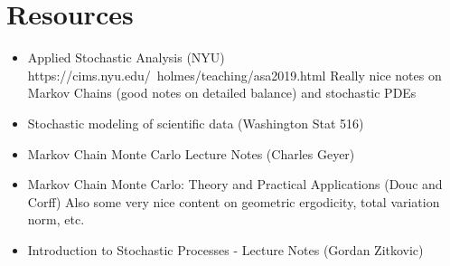 \documentclass[12pt]{article}
\begin{document}
\section{Resources}
\begin{itemize}
\item Applied Stochastic Analysis (NYU)
https://cims.nyu.edu/~holmes/teaching/asa2019.html
Really nice notes on Markov Chains (good notes on detailed balance) and stochastic PDEs
\item Stochastic modeling of scientific data (Washington Stat 516)
\item Markov Chain Monte Carlo Lecture Notes (Charles Geyer)
\item Markov Chain Monte Carlo: Theory and Practical Applications (Douc and Corff)
Also some very nice content on geometric ergodicity, total variation norm, etc.
\item Introduction to Stochastic Processes - Lecture Notes (Gordan Zitkovic)
\end{itemize}
\end{document}
